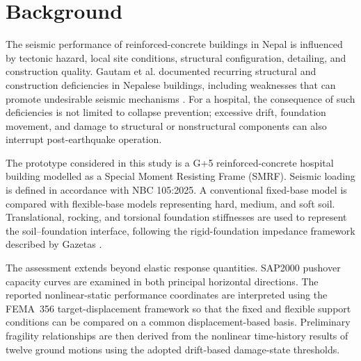 \section{Background}
The seismic performance of reinforced-concrete buildings in Nepal is influenced by tectonic hazard, local site conditions, structural configuration, detailing, and construction quality. Gautam et al. documented recurring structural and construction deficiencies in Nepalese buildings, including weaknesses that can promote undesirable seismic mechanisms \cite{gautam2016}. For a hospital, the consequence of such deficiencies is not limited to collapse prevention; excessive drift, foundation movement, and damage to structural or nonstructural components can also interrupt post-earthquake operation.

The prototype considered in this study is a G+5 reinforced-concrete hospital building modelled as a Special Moment Resisting Frame (SMRF). Seismic loading is defined in accordance with NBC 105:2025. A conventional fixed-base model is compared with flexible-base models representing hard, medium, and soft soil. Translational, rocking, and torsional foundation stiffnesses are used to represent the soil--foundation interface, following the rigid-foundation impedance framework described by Gazetas \cite{gazetas1991}.

The assessment extends beyond elastic response quantities. SAP2000 pushover capacity curves are examined in both principal horizontal directions. The reported nonlinear-static performance coordinates are interpreted using the FEMA~356 target-displacement framework so that the fixed and flexible support conditions can be compared on a common displacement-based basis. Preliminary fragility relationships are then derived from the nonlinear time-history results of twelve ground motions using the adopted drift-based damage-state thresholds.
